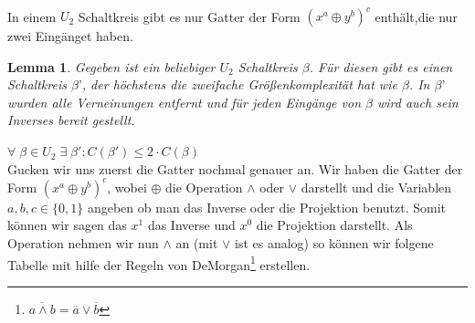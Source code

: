 \documentclass[a4paper]{article}
\newtheorem{lemma}{Lemma}
\begin{document}


$\;$ \\

In einem $U_2$ Schaltkreis gibt es nur Gatter der Form $(x^a\oplus y^b)^c$ enth\"alt,die nur zwei Eing\"anget haben.\\

\begin{lemma}
  Gegeben ist ein beliebiger $U_2$ Schaltkreis $\beta$. F\"ur diesen gibt es einen Schaltkreis $\beta’$, der h\"ochstens
  die zweifache Gr\"o\ss{}enkomplexit\"at hat wie $\beta$. In $\beta’$ wurden alle Verneinungen entfernt und f\"ur jeden Eing\"ange von
  $\beta$ wird auch sein Inverses bereit gestellt.
\end{lemma}

$\forall \; \beta \in U_2 \; \exists \; \beta' : C(\beta') \leq 2 \cdot C(\beta)$\\

Gucken wir uns zuerst die Gatter nochmal genauer an. Wir haben die Gatter der Form $(x^a\oplus y^b)^c$, wobei $\oplus$ die Operation $\wedge$ oder $\vee$ darstellt
und die Variablen $a,b,c \in \{0,1\}$ angeben ob man das Inverse oder die Projektion benutzt. Somit k\"onnen wir sagen das $x^1$ das Inverse und
$x^0$ die Projektion darstellt. Als Operation nehmen wir nun $\wedge$ an (mit $\vee$ ist es analog) so k\"onnen wir folgene Tabelle mit hilfe der Regeln von DeMorgan\footnote{$\overline{a\land{}b}=\overline{a}\lor\overline{b}$} erstellen.\\
\end{document}
